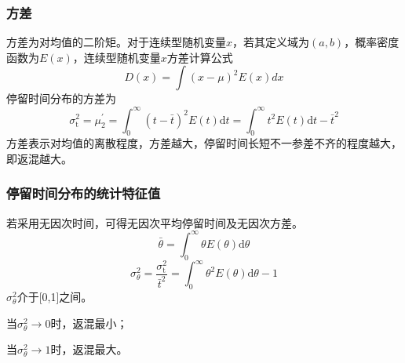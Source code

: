 \documentclass[dvipsnames, svgnames, x11names]{beamer}
\begin{document}
\begin{frame}
    \frametitle{方差}
    方差为对均值的二阶矩。对于连续型随机变量$x$，若其定义域为$(a,b)$，概率密度函数为$E(x)$，连续型随机变量$x$方差计算公式
    \[
        D(x) = \int(x-\mu)^2E(x)dx
    \]
    停留时间分布的方差为
        \[
            \sigma_{\mathrm{t}}^{2}=\mu_{2}^{\prime}=\int_{0}^{\infty}(t-\bar{t})^{2} E(t) \mathrm{d} t=\int_{0}^{\infty} t^{2} E(t) \mathrm{d} t-\bar{t}^{2} 
        \]
    方差表示对均值的离散程度，方差越大，停留时间长短不一参差不齐的程度越大，即返混越大。
\end{frame}


\begin{frame}
    \frametitle{停留时间分布的统计特征值}

    若采用无因次时间，可得无因次平均停留时间及无因次方差。
    \[
        \bar{\theta}=\int_{0}^{\infty} \theta E(\theta) \mathrm{d} \theta
    \]
    \[
        \sigma_{\theta}^{2}=\frac{\sigma_{\mathrm{t}}^{2}}{\bar{t}^{2}}=\int_{0}^{\infty} \theta^{2} E(\theta) \mathrm{d} \theta-1
    \]
    $\sigma_{\theta}^{2}$介于[0,1]之间。

    当$\sigma_{\theta}^{2} \to 0$时，返混最小；

    当$\sigma_{\theta}^{2} \to 1$时，返混最大。

\end{frame}
\end{document}
